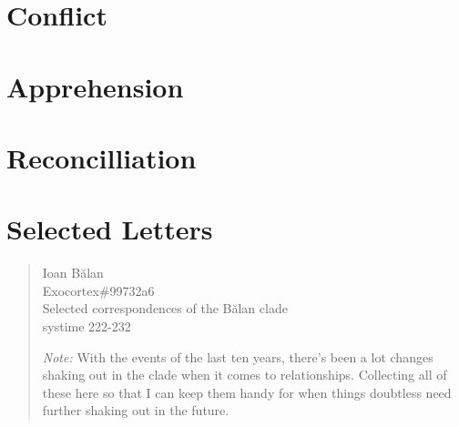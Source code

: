 \documentclass[11pt]{memoir}
\begin{document}
  
  
  
  
  
  
  
  

  \part{Conflict}

  
  
  
  
  
  
  
  
  

  \part{Apprehension}

  
  
  
  
  
  

  \part{Reconcilliation}

  \part*{Selected Letters}

  \begin{quote}
    Ioan Bălan \\
    Exocortex\#99732a6 \\
    Selected correspondences of the Bălan clade \\
    systime 222-232
    
    \emph{Note:} With the events of the last ten years, there's been a lot changes shaking out in the clade when it comes to relationships. Collecting all of these here so that I can keep them handy for when things doubtless need further shaking out in the future.
  \end{quote}

  

  \backmatter

  \markboth{}{}


  
\end{document}
